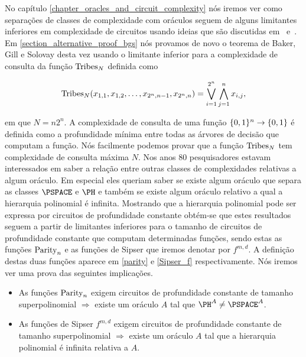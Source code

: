 No capítulo \ref{chapter_oracles_and_circuit_complexity} nós iremos ver como separações de classes de complexidade com oráculos seguem de alguns limitantes inferiores em complexidade de circuitos usando ideias que são discutidas em~\cite{ko1989constructing} e~\cite{DBLP:journals/sigact/RossmanST15}. Em \ref{section_alternative_proof_bgs} nós provamos de novo o teorema de Baker, Gill e Solovay desta vez usando o limitante inferior para a complexidade de consulta da função $\text{Tribes}_{N}$ definida como

\begin{equation*}
    \text{Tribes}_{N}(x_{1, 1}, x_{1, 2}, \dots, x_{2^{n}, n - 1}, x_{2^{n}, n}) = \bigvee_{i = 1}^{2^{n}} \bigwedge_{j = 1}^{n} x_{i, j},
\end{equation*}

em que $N = n2^{n}$. A complexidade de consulta de uma função $\{0, 1\}^{n} \to \{0, 1\}$ é definida como a profundidade mínima entre todas as árvores de decisão que computam a função. Nós facilmente podemos provar que a função $\text{Tribes}_{N}$ tem complexidade de consulta máxima $N$. Nos anos 80 pesquisadores estavam interessados em saber a relação entre outras classes de complexidades relativas a algum oráculo. Em especial eles queriam saber se existe algum oráculo que separa as classes $\PSPACE$ e $\PH$ e também se existe algum oráculo relativo a qual a hierarquia polinomial é infinita. Mostrando que a hierarquia polinomial pode ser expressa por circuitos de profundidade constante obtém-se que estes resultados seguem a partir de limitantes inferiores para o tamanho de circuitos de profundidade constante que computam determinadas funções, sendo estas as funções $\text{Parity}_{n}$ e as funções de Sipser que iremos denotar por $f^{m, d}$. A definição destas duas funções aparece em \ref{parity} e \ref{Sipser_f} respectivamente. Nós iremos ver uma prova das seguintes implicações.

\begin{itemize}

    \item As funções $\text{Parity}_{n}$ exigem circuitos de profundidade constante de tamanho superpolinomial $\Rightarrow$ existe um oráculo $A$ tal que $\PH^{A} \neq \PSPACE^{A}$.
    
    \item As funções de Sipser $f^{m, d}$ exigem circuitos de profundidade constante de tamanho superpolinomial $\Rightarrow$ existe um oráculo $A$ tal que a hierarquia polinomial é infinita relativa a $A$.

\end{itemize}

